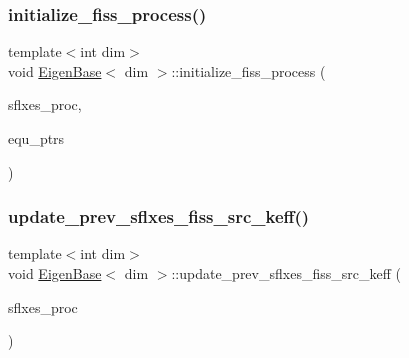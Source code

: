 \mbox{\label{class_eigen_base_a833156f74622e81a0e4e191e1b972186}} 
\subsubsection{\texorpdfstring{initialize\+\_\+fiss\+\_\+process()}{initialize\_fiss\_process()}}
{\footnotesize\ttfamily template$<$int dim$>$ \\
void \hyperlink{class_eigen_base}{Eigen\+Base}$<$ dim $>$\+::initialize\+\_\+fiss\+\_\+process (\begin{DoxyParamCaption}\item[{std\+::vector$<$ Vector$<$ double $>$ $>$ \&}]{sflxes\+\_\+proc,  }\item[{std\+::vector$<$ std\+\_\+cxx11\+::shared\+\_\+ptr$<$ \hyperlink{class_equation_base}{Equation\+Base}$<$ dim $>$ $>$ $>$ \&}]{equ\+\_\+ptrs }\end{DoxyParamCaption})\hspace{0.3cm}{\ttfamily [protected]}}

\mbox{\label{class_eigen_base_aa51c202e12e88c70652aefbe4d399f2b}} 
\subsubsection{\texorpdfstring{update\+\_\+prev\+\_\+sflxes\+\_\+fiss\+\_\+src\+\_\+keff()}{update\_prev\_sflxes\_fiss\_src\_keff()}}
{\footnotesize\ttfamily template$<$int dim$>$ \\
void \hyperlink{class_eigen_base}{Eigen\+Base}$<$ dim $>$\+::update\+\_\+prev\+\_\+sflxes\+\_\+fiss\+\_\+src\+\_\+keff (\begin{DoxyParamCaption}\item[{std\+::vector$<$ Vector$<$ double $>$ $>$ \&}]{sflxes\+\_\+proc }\end{DoxyParamCaption})\hspace{0.3cm}{\ttfamily [virtual]}}



